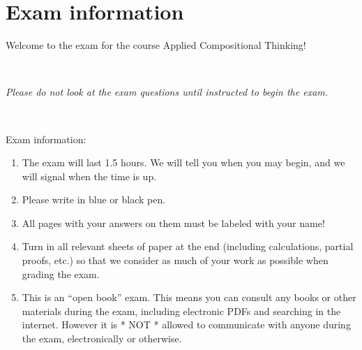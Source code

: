 \documentclass[paper=8.125in:10.250in,pagesize=pdftex,
    headinclude=false,footinclude=false,oneside,egregdoesnotlikesansseriftitles]{kaobook}
\begin{document}
\newpage

\section*{Exam information}


Welcome to the exam for the course Applied Compositional Thinking!

\

\emph{Please do not look at the exam questions until instructed to begin the exam.}

\

Exam information:
\begin{enumerate}
\item The exam will last 1.5 hours. We will tell you when you may begin, and we will signal when the time is up.
\item Please write in blue or black pen.
\item All pages with your answers on them must be labeled with your name!
\item Turn in all relevant sheets of paper at the end (including calculations, partial proofs, etc.) so that we consider as much of your work as possible when grading the exam.
\item This is an ``open book'' exam. This means you can consult any books or other materials during the exam, including electronic PDFs and searching in the internet. However it is * NOT * allowed to communicate with anyone during the exam, electronically or otherwise.
\end{enumerate}

\newpage
\end{document}
